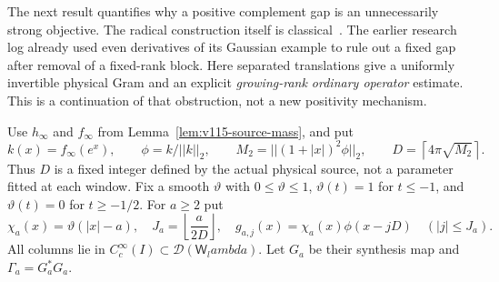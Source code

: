 \documentclass[11pt]{article}
\def\lambda{lambda}%
\def\norm#1{||#1||}%
\theoremstyle{remark}
\newcommand{\norm}[1]{\left\lVert #1\right\rVert}
\begin{document}
The next result quantifies why a positive complement gap is an
unnecessarily strong objective.  The radical construction itself is
classical~\cite[Section 3]{ConnesConsani2023}.  The earlier research
log already used even derivatives of its Gaussian example to rule out
a fixed gap after removal of a fixed-rank block.  Here separated
translations give a uniformly invertible physical Gram and an explicit
\emph{growing-rank ordinary operator} estimate.  This is a continuation
of that obstruction, not a new positivity mechanism.

Use $h_\infty$ and $f_\infty$ from
Lemma~\ref{lem:v115-source-mass}, and put
\[
 k(x)=f_\infty(e^x),\qquad \phi=k/\norm k_2,\qquad
 M_2=\norm{(1+|x|)^2\phi}_2,\qquad
 D=\left\lceil4\pi\sqrt{M_2}\right\rceil.
\]
Thus $D$ is a fixed integer defined by the actual physical source,
not a parameter fitted at each window.  Fix a smooth $\vartheta$ with
$0\le\vartheta\le1$, $\vartheta(t)=1$ for $t\le-1$, and
$\vartheta(t)=0$ for $t\ge-1/2$.  For $a\ge2$ put
\[
 \chi_a(x)=\vartheta(|x|-a),\quad
 J_a=\left\lfloor\frac{a}{2D}\right\rfloor,\quad
 g_{a,j}(x)=\chi_a(x)\phi(x-jD)\quad(|j|\le J_a).
\]
All columns lie in $C_c^\infty(I)\subset\mathcal D(\mathsf W_\lambda)$.
Let $G_a$ be their synthesis map and $\Gamma_a=G_a^*G_a$.
\end{document}
